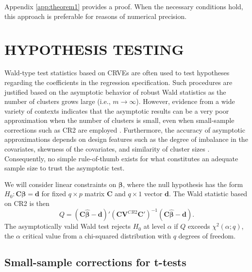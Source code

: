 \documentclass[12pt]{article}\usepackage[]{graphicx}\usepackage[]{color}
\newcommand{\bm}{\mathbf}
\newcommand{\bs}{\boldsymbol}
\begin{document}
Appendix \ref{app:theorem1} provides a proof. When the necessary conditions hold, this approach is preferable for reasons of numerical precision.

\section{HYPOTHESIS TESTING}
\label{sec:testing}

Wald-type test statistics based on CRVEs are often used to test hypotheses regarding the coefficients in the regression specification. 
Such procedures are justified based on the asymptotic behavior of robust Wald statistics as the number of clusters grows large (i.e., $m \to \infty$). 
However, evidence from a wide variety of contexts indicates that the asymptotic results can be a very poor approximation when the number of clusters is small, even when small-sample corrections such as CR2 are employed \citep{Bell2002bias, Bertrand2004how, Cameron2008bootstrap}. 
Furthermore, the accuracy of asymptotic approximations depends on design features such as the degree of imbalance in the covariates, skewness of the covariates, and similarity of cluster sizes \citep{McCaffrey2001generalizations, Tipton2015small, Webb2013wild}. 
Consequently, no simple rule-of-thumb exists for what constitutes an adequate sample size to trust the asymptotic test. 

We will consider linear constraints on $\bs\beta$, where the null hypothesis has the form $H_0: \bm{C}\bs\beta = \bm{d}$ for fixed $q \times p$ matrix $\bm{C}$ and $q \times 1$ vector $\bm{d}$. 
The Wald statistic based on CR2 is then \[
Q = \left(\bm{C}\bs{\hat\beta} - \bm{d}\right)'\left(\bm{C} \bm{V}^{CR2} \bm{C}'\right)^{-1}\left(\bm{C}\bs{\hat\beta} - \bm{d}\right).
\]
The asymptotically valid Wald test rejects $H_0$ at level $\alpha$ if $Q$ exceeds $\chi^2(\alpha; q)$, the $\alpha$ critical value from a chi-squared distribution with $q$ degrees of freedom.

\subsection{Small-sample corrections for t-tests}
\end{document}
